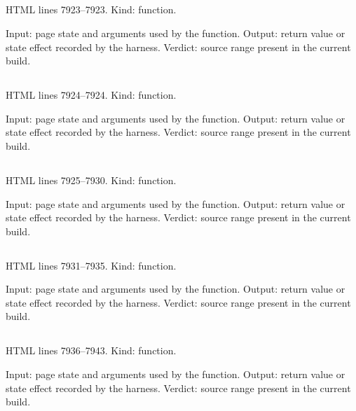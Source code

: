\subsection*{\texttt{}}
\label{vf_407_appHeapMB}
HTML lines 7923--7923. Kind: function.

Input: page state and arguments used by the function.
Output: return value or state effect recorded by the harness.
Verdict: source range present in the current build.

\subsection*{\texttt{}}
\label{vf_408_appStagedBytes}
HTML lines 7924--7924. Kind: function.

Input: page state and arguments used by the function.
Output: return value or state effect recorded by the harness.
Verdict: source range present in the current build.

\subsection*{\texttt{}}
\label{vf_409_appNotice}
HTML lines 7925--7930. Kind: function.

Input: page state and arguments used by the function.
Output: return value or state effect recorded by the harness.
Verdict: source range present in the current build.

\subsection*{\texttt{}}
\label{vf_410_appCancel}
HTML lines 7931--7935. Kind: function.

Input: page state and arguments used by the function.
Output: return value or state effect recorded by the harness.
Verdict: source range present in the current build.

\subsection*{\texttt{}}
\label{vf_411_appReadSuperseded}
HTML lines 7936--7943. Kind: function.

Input: page state and arguments used by the function.
Output: return value or state effect recorded by the harness.
Verdict: source range present in the current build.

